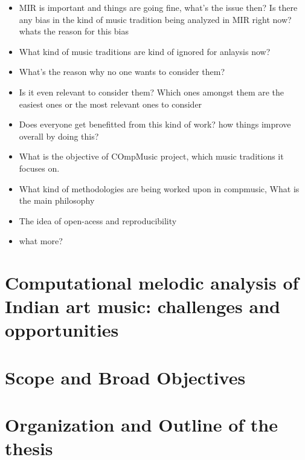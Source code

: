 \begin{itemize}
	\item MIR is important and things are going fine, what's the issue then? Is there any bias in the kind of music tradition being analyzed in MIR right now? whats the reason for this bias
	\item What kind of music traditions are kind of ignored for anlaysis now?
	\item What's the reason why no one wants to consider them?
	\item Is it even relevant to consider them? Which ones amongst them are the easiest ones or the most relevant ones to consider
	\item Does everyone get benefitted from this kind of work? how things improve overall by doing this?
	\item What is the objective of COmpMusic project, which music traditions it focuses on. 
	\item What kind of methodologies are being worked upon in compmusic, What is the main philosophy
	\item The idea of open-acess and reproducibility
	\item what more?
\end{itemize}

\section{Computational melodic analysis of Indian art music: challenges and opportunities}
\label{sec:intro_challenges_oppurtunities}

%
%

\section{Scope and Broad Objectives}
\label{sec:intro_scope_context_relevance}

\section{Organization and Outline of the thesis}
\label{sec:intro_organization}
